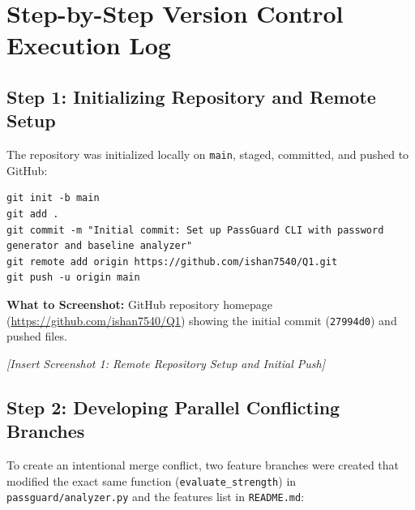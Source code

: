 \documentclass[11pt,a4paper]{article}
\begin{document}
\section{Step-by-Step Version Control Execution Log}

\subsection{Step 1: Initializing Repository and Remote Setup}
The repository was initialized locally on \texttt{main}, staged, committed, and pushed to GitHub:
\begin{lstlisting}[style=terminal]
git init -b main
git add .
git commit -m "Initial commit: Set up PassGuard CLI with password generator and baseline analyzer"
git remote add origin https://github.com/ishan7540/Q1.git
git push -u origin main
\end{lstlisting}

\begin{tcolorbox}[colback=blue!4!white,colframe=blue!70!black,title=\textbf{Screenshot Placeholder 1: Initial Repository Push on GitHub}]
\textbf{What to Screenshot:} GitHub repository homepage (\url{https://github.com/ishan7540/Q1}) showing the initial commit (\texttt{27994d0}) and pushed files.
\vspace{2.5cm}
\begin{center}
\textit{[Insert Screenshot 1: Remote Repository Setup and Initial Push]}
\end{center}
\end{tcolorbox}

\subsection{Step 2: Developing Parallel Conflicting Branches}
To create an intentional merge conflict, two feature branches were created that modified the exact same function (\texttt{evaluate\_strength}) in \texttt{passguard/analyzer.py} and the features list in \texttt{README.md}:
\end{document}
